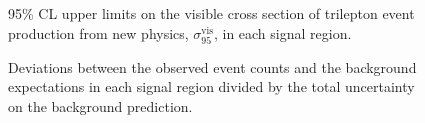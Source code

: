 \begin{figure}
	\centering
	\caption{95\% CL upper limits on the visible cross section of trilepton event production from new physics, $\sigma_{95}^{\mathrm{vis}}$, in each signal region. }
	\label{fig:model-independent-sigmavis}
\end{figure}

\begin{figure}
	\centering
	\caption{Deviations between the observed event counts and the background expectations in each signal region divided by the total uncertainty on the background prediction.}
	\label{fig:model-independent-summary-sigma}
\end{figure}



